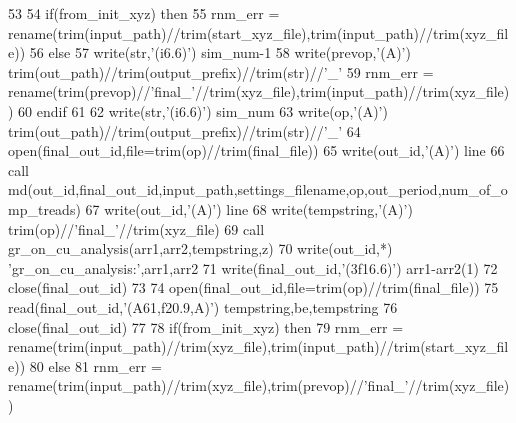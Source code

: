 \begin{DoxyCode}
53 
54         \textcolor{keywordflow}{if}(from\_init\_xyz) \textcolor{keywordflow}{then}
55             rnm\_err = rename(trim(input\_path)//trim(start\_xyz\_file),trim(input\_path\textcolor{comment}{)//trim(xyz\_file))}
56 \textcolor{comment}{        }\textcolor{keywordflow}{else}
57             \textcolor{keyword}{write}(str,\textcolor{stringliteral}{'(i6.6)'}) sim\_num-1
58             \textcolor{keyword}{write}(prevop,\textcolor{stringliteral}{'(A)'}) trim(out\_path)//trim(output\_prefix)//trim(str)//\textcolor{stringliteral}{'\_'}
59             rnm\_err = rename(trim(prevop)//\textcolor{stringliteral}{'final\_'}//trim(xyz\_file),trim(input\_path\textcolor{comment}{)//trim(xyz\_file))}
60 \textcolor{comment}{}\textcolor{keywordflow}{        endif}
61 
62         \textcolor{keyword}{write}(str,\textcolor{stringliteral}{'(i6.6)'}) sim\_num
63         \textcolor{keyword}{write}(op,\textcolor{stringliteral}{'(A)'}) trim(out\_path)//trim(output\_prefix)//trim(str)//\textcolor{stringliteral}{'\_'}
64         \textcolor{keyword}{open}(final\_out\_id,file=trim(op)//trim(final\_file))
65         \textcolor{keyword}{write}(out\_id,\textcolor{stringliteral}{'(A)'}) line
66         \textcolor{keyword}{call }md(out\_id,final\_out\_id,input\_path,settings\_filename,op,out\_period\textcolor{comment}{,num\_of\_omp\_treads)}
67 \textcolor{comment}{        }\textcolor{keyword}{write}(out\_id,\textcolor{stringliteral}{'(A)'}) line
68         \textcolor{keyword}{write}(tempstring,\textcolor{stringliteral}{'(A)'}) trim(op)//\textcolor{stringliteral}{'final\_'}//trim(xyz\_file)
69         \textcolor{keyword}{call }gr\_on\_cu\_analysis(arr1,arr2,tempstring,z)
70         \textcolor{keyword}{write}(out\_id,*) \textcolor{stringliteral}{'gr\_on\_cu\_analysis:'},arr1,arr2
71         \textcolor{keyword}{write}(final\_out\_id,\textcolor{stringliteral}{'(3f16.6)'}) arr1-arr2(1)
72         \textcolor{keyword}{close}(final\_out\_id)
73 
74         \textcolor{keyword}{open}(final\_out\_id,file=trim(op)//trim(final\_file))
75         \textcolor{keyword}{read}(final\_out\_id,\textcolor{stringliteral}{'(A61,f20.9,A)'}) tempstring,be,tempstring
76         \textcolor{keyword}{close}(final\_out\_id)
77 
78         \textcolor{keywordflow}{if}(from\_init\_xyz) \textcolor{keywordflow}{then}
79             rnm\_err = rename(trim(input\_path)//trim(xyz\_file),trim(input\_path)//trim\textcolor{comment}{(start\_xyz\_file))}
80 \textcolor{comment}{        }\textcolor{keywordflow}{else}
81             rnm\_err = rename(trim(input\_path)//trim(xyz\_file),trim(prevop)//\textcolor{stringliteral}{'final\_'}\textcolor{comment}{//trim(xyz\_file))}

\end{DoxyCode}
